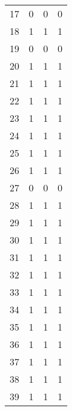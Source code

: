 \begin{longtable}{cp{1.5cm}p{1.5cm}p{1.5cm}}
17 &                           0 &                         0 &                          0 \\
18 &                           1 &                         1 &                          1 \\
19 &                           0 &                         0 &                          0 \\
20 &                           1 &                         1 &                          1 \\
21 &                           1 &                         1 &                          1 \\
22 &                           1 &                         1 &                          1 \\
23 &                           1 &                         1 &                          1 \\
24 &                           1 &                         1 &                          1 \\
25 &                           1 &                         1 &                          1 \\
26 &                           1 &                         1 &                          1 \\
27 &                           0 &                         0 &                          0 \\
28 &                           1 &                         1 &                          1 \\
29 &                           1 &                         1 &                          1 \\
30 &                           1 &                         1 &                          1 \\
31 &                           1 &                         1 &                          1 \\
32 &                           1 &                         1 &                          1 \\
33 &                           1 &                         1 &                          1 \\
34 &                           1 &                         1 &                          1 \\
35 &                           1 &                         1 &                          1 \\
36 &                           1 &                         1 &                          1 \\
37 &                           1 &                         1 &                          1 \\
38 &                           1 &                         1 &                          1 \\
39 &                           1 &                         1 &                          1 \\
\end{longtable}

